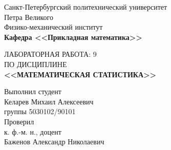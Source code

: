 \documentclass[main.tex]{subfiles}
\begin{document}
\begin{titlepage}
\begin{center}
	\begin{large}
		Санкт-Петербургский политехнический университет\\ Петра Великого\\		
		\vspace{\baselineskip}
		Физико-механический институт\\
		\textbf{Кафедра <<Прикладная математика>>}\\
	\end{large}
	\vfill
	\Large{{ЛАБОРАТОРНАЯ РАБОТА: 9
	\\ {ПО ДИСЦИПЛИНЕ} \\\textbf{<<МАТЕМАТИЧЕСКАЯ СТАТИСТИКА>>}}}
\end{center}
\vfill
\begin{flushright}	
	Выполнил студент\\
	Келарев Михаил Алексеевич\\
	группы 5030102/90101\\
	\vspace{\baselineskip}	
	Проверил\\
	к. ф.-м. н., доцент\\
	Баженов Александр Николаевич
\end{flushright}
\vfill
{}
\end{titlepage}
\end{document}
